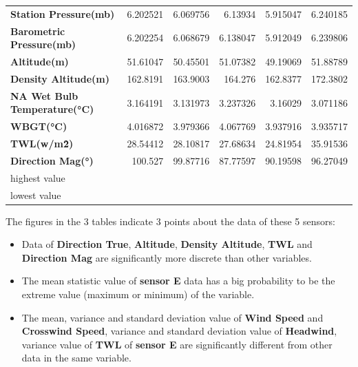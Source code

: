 \documentclass[a4paper]{article}
\begin{document}
\begin{table}[htbp]
\begin{tabular}{lrrrrr}
    \textbf{Station Pressure(mb)} & 6.202521 & 6.069756 & 6.13934 & \cellcolor[rgb]{ .608,  .804,  .608}5.915047 & \cellcolor[rgb]{ .98,  .502,  .447}6.240185 \\
    \textbf{Barometric Pressure(mb)} & 6.202254 & 6.068679 & 6.138047 & \cellcolor[rgb]{ .608,  .804,  .608}5.912049 & \cellcolor[rgb]{ .98,  .502,  .447}6.239806 \\
    \textbf{Altitude(m)} & 51.61047 & 50.45501 & 51.07382 & \cellcolor[rgb]{ .608,  .804,  .608}49.19069 & \cellcolor[rgb]{ .98,  .502,  .447}51.88789 \\
    \textbf{Density Altitude(m)} & \cellcolor[rgb]{ .608,  .804,  .608}162.8191 & 163.9003 & 164.276 & 162.8377 & \cellcolor[rgb]{ .98,  .502,  .447}172.3802 \\
    \textbf{NA Wet Bulb Temperature(°C)} & 3.164191 & 3.131973 & \cellcolor[rgb]{ .98,  .502,  .447}3.237326 & 3.16029 & \cellcolor[rgb]{ .608,  .804,  .608}3.071186 \\
    \textbf{WBGT(°C)} & 4.016872 & 3.979366 & \cellcolor[rgb]{ .98,  .502,  .447}4.067769 & 3.937916 & \cellcolor[rgb]{ .608,  .804,  .608}3.935717 \\
    \textbf{TWL(w/m\^2)} & 28.54412 & 28.10817 & 27.68634 & 24.81954 & \cellcolor[rgb]{ .98,  .502,  .447}35.91536 \\
    \textbf{Direction Mag(°)} & \cellcolor[rgb]{ .98,  .502,  .447}100.527 & 99.87716 & \cellcolor[rgb]{ .608,  .804,  .608}87.77597 & 90.19598 & 96.27049 \\
    \midrule
    \rowcolor[rgb]{ .98,  .502,  .447} highest value & \cellcolor[rgb]{ 1,  1,  1} & \cellcolor[rgb]{ 1,  1,  1} & \cellcolor[rgb]{ 1,  1,  1} & \cellcolor[rgb]{ 1,  1,  1} & \cellcolor[rgb]{ 1,  1,  1} \\
    \rowcolor[rgb]{ .608,  .804,  .608} lowest value & \cellcolor[rgb]{ 1,  1,  1} & \cellcolor[rgb]{ 1,  1,  1} & \cellcolor[rgb]{ 1,  1,  1} & \cellcolor[rgb]{ 1,  1,  1} & \cellcolor[rgb]{ 1,  1,  1} \\
    \end{tabular}%
  \label{"tab:addlabel"}%
\end{table}%

\noindent The figures in the 3 tables indicate 3 points about the data of these 5 sensors:

\begin{itemize}
    \item Data of \textbf{Direction True}, \textbf{Altitude}, \textbf{Density Altitude}, \textbf{TWL} and \textbf{Direction Mag} are significantly more discrete than other variables.
    \item The mean statistic value of \textbf{sensor E} data has a big probability to be the extreme value (maximum or minimum) of the variable.
    \item The mean, variance and standard deviation value of \textbf{Wind Speed} and \textbf{Crosswind Speed}, variance and standard deviation value of \textbf{Headwind}, variance value of \textbf{TWL} of \textbf{sensor E} are significantly different from other data in the same variable.
\end{itemize}
\end{document}
